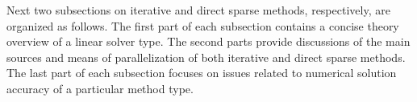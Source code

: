 
Next two subsections on iterative and direct sparse methods, respectively, are organized as follows. The first part of each subsection contains a concise theory overview of a linear solver type. The second parts provide discussions of the main sources and means of parallelization of both iterative and direct sparse methods. The last part of each subsection focuses on issues related to numerical solution accuracy of a particular method type.\\